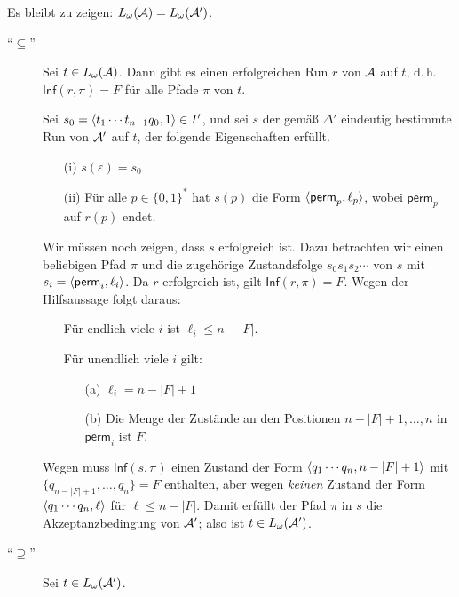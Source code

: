 \documentclass[fontsize=11pt, twoside=false, numbers=autoenddot]{scrbook}
\begin{document}
Es bleibt zu zeigen: $L_\omega(\mathcal{A}) = L_\omega(\mathcal{A}')$.
%
\begin{description}
  \item[{\boldmath"`$\subseteq$"'}]
    Sei $t \in L_\omega(\mathcal{A})$.
    Dann gibt es einen erfolgreichen Run $r$ von $\mathcal{A}$ auf $t$,
    d.\,h.\ $\textsf{Inf}(r,\pi) = F$ für alle Pfade $\pi$ von $t$.
    
    Sei $s_0 = \langle t_1\cdots t_{n-1}q_0,1\rangle \in I'$,
    und sei $s$ der gemäß $\Delta'$ eindeutig bestimmte Run von $\mathcal{A}'$ auf $t$,
    der folgende Eigenschaften erfüllt.
    \begin{enumerate}
      \item[(i)]
        $s(\varepsilon) = s_0$
      \item[(ii)]
        Für alle $p \in \{0,1\}^*$ hat $s(p)$ die Form $\langle \textsf{perm}_p,\ell_p\rangle$,
        wobei $\textsf{perm}_p$ auf $r(p)$ endet.
    \end{enumerate}
    Wir müssen noch zeigen, dass $s$ erfolgreich ist.
    Dazu betrachten wir einen beliebigen Pfad $\pi$
    und die zugehörige Zustandsfolge $s_0s_1s_2\cdots$ von $s$
    mit $s_i = \langle \textsf{perm}_i,\ell_i\rangle$.
    Da $r$ erfolgreich ist, gilt $\textsf{Inf}(r,\pi) = F$.
    Wegen der Hilfsaussage folgt daraus:
    \begin{enumerate}
      \item[\circled{1}]
        Für endlich viele $i$ ist $\ell_i \leq n - |F|$.
      \item[\circled{2}]
        Für unendlich viele $i$ gilt:
        \begin{enumerate}
          \item[(a)]
            $\ell_i = n - |F| + 1$
          \item[(b)]
            Die Menge der Zustände an den Positionen $n - |F| + 1,\dots,n$ in $\textsf{perm}_i$ ist $F$.
        \end{enumerate}
    \end{enumerate}
    Wegen  muss $\textsf{Inf}(s,\pi)$ einen Zustand der Form 
    $\langle q_1\cdots q_n, n-|F|+1\rangle$ mit $\{q_{n-|F|+1},\dots,q_n\} = F$ enthalten,
    aber wegen  \emph{keinen} Zustand der Form
    $\langle q_1\cdots q_n,\ell\rangle$ für $\ell \leq n-|F|$.
    Damit erfüllt der Pfad $\pi$ in $s$ die Akzeptanzbedingung von $\mathcal{A}'$;
    also ist $t \in L_\omega(\mathcal{A}')$.
    \par\medskip
  \item[{\boldmath"`$\supseteq$"'}]
    Sei $t \in L_\omega(\mathcal{A}')$.

\end{description}
\end{document}
